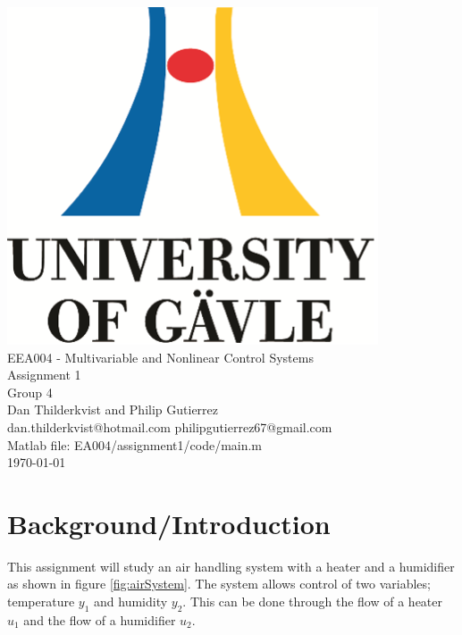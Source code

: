 \documentclass[a4paper, titlepage]{article}
\begin{document}
\begin{titlepage}
\begin{center}
\vspace*{1cm}
\includegraphics[scale=1.0]{../figures/hig_logo_eng.png}\\
\vspace{1.5cm}
\large EEA004 - Multivariable and Nonlinear Control Systems\\
\large Assignment 1\\
\vspace{1.5cm}
Group 4\\
Dan Thilderkvist and Philip Gutierrez\\
dan.thilderkvist@hotmail.com philipgutierrez67@gmail.com\\
Matlab file: EA004/assignment1/code/main.m\\
\vspace{1cm}
\today
\end{center}
\end{titlepage}



\section{Background/Introduction}
This assignment will study an air handling system with a heater and a humidifier as shown in figure \ref{fig:airSystem}.
The system allows control of two variables; temperature $y_1$ and humidity $y_2$.
This can be done through the flow of a heater $u_1$ and the flow of a humidifier $u_2$.
\end{document}
